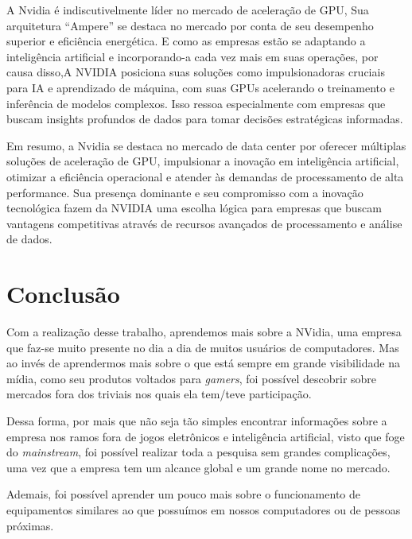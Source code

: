 \documentclass[conference]{IEEEtran}
\begin{document}
A Nvidia é indiscutivelmente líder no mercado de aceleração de GPU, Sua arquitetura “Ampere” se destaca no mercado por conta de seu desempenho superior e eficiência energética. E como as empresas estão se adaptando a inteligência artificial e incorporando-a cada vez mais em suas operações, por causa disso,A NVIDIA posiciona suas soluções como impulsionadoras cruciais para IA e aprendizado de máquina, com suas GPUs acelerando o treinamento e inferência de modelos complexos. Isso ressoa especialmente com empresas que buscam insights profundos de dados para tomar decisões estratégicas informadas.

Em resumo, a Nvidia se destaca no mercado de data center por oferecer múltiplas soluções de aceleração de GPU, impulsionar a inovação em inteligência artificial, otimizar a eficiência operacional e atender às demandas de processamento de alta performance. Sua presença dominante e seu compromisso com a inovação tecnológica fazem da NVIDIA uma escolha lógica para empresas que buscam vantagens competitivas através de recursos avançados de processamento e análise de dados.

\section{Conclusão}
\par Com a realização desse trabalho, aprendemos mais sobre a NVidia, uma empresa que faz-se muito presente no dia a dia de muitos usuários de computadores. Mas ao invés de aprendermos mais sobre o que está sempre em grande visibilidade na mídia, como seu produtos voltados para \textit{gamers}, foi possível descobrir sobre mercados fora dos triviais nos quais ela tem/teve participação.
\par Dessa forma, por mais que não seja tão simples encontrar informações sobre a empresa nos ramos fora de jogos eletrônicos e inteligência artificial, visto que foge do \textit{mainstream}, foi possível realizar toda a pesquisa sem grandes complicações, uma vez que a empresa tem um alcance global e um grande nome no mercado.
\par Ademais, foi possível aprender um pouco mais sobre o funcionamento de equipamentos similares ao que possuímos em nossos computadores ou de pessoas próximas.
\end{document}
